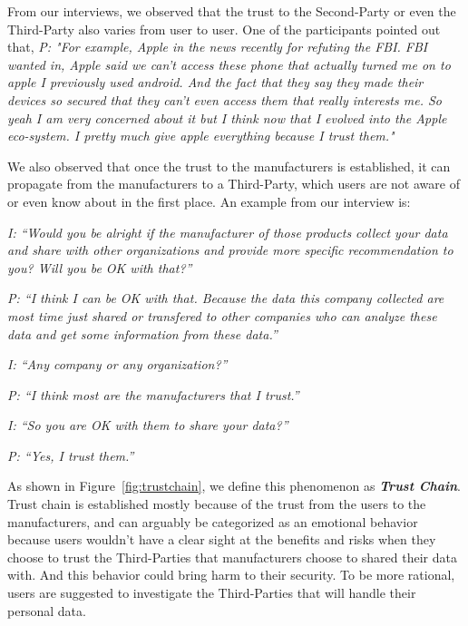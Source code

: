 From our interviews, we observed that the trust to the Second-Party or even the Third-Party also varies from user to user. One of the participants pointed out that, \textit{P: "For example, Apple in the news recently for refuting the FBI. FBI wanted in, Apple said we can't access these phone that actually turned me on to apple I previously used android. And the fact that they say they made their devices so secured that they can't even access them that really interests me. So yeah I am very concerned about it but I think now that I evolved into the Apple eco-system. I pretty much give apple everything because I trust them."}



We also observed that once the trust to the manufacturers is established, it can propagate from the manufacturers to a Third-Party, which users are not aware of or even know about in the first place. An example from our interview is:

\textit{I: ``Would you be alright if the manufacturer of those products collect your data and share with other organizations and provide more specific recommendation to you? Will you be OK with that?''\\}

\textit{P: ``I think I can be OK with that. Because the data this company collected are most time just shared or transfered to other companies who can analyze these data and get some information from these data.''\\}

\textit{I: ``Any company or any organization?''\\}

\textit{P: ``I think most are the manufacturers that I trust.''\\}

\textit{I: ``So you are OK with them to share your data?''\\}

\textit{P: ``Yes, I trust them.''\\}

As shown in Figure~\ref{fig:trustchain}, we define this phenomenon as \textit{\textbf{Trust Chain}}. Trust chain is established mostly because of the trust from the users to the manufacturers, and can arguably be categorized as an emotional behavior because users wouldn't have a clear sight at the benefits and risks when they choose to trust the Third-Parties that manufacturers choose to shared their data with. And this behavior could bring harm to their security. To be more rational, users are suggested to investigate the Third-Parties that will handle their personal data.


